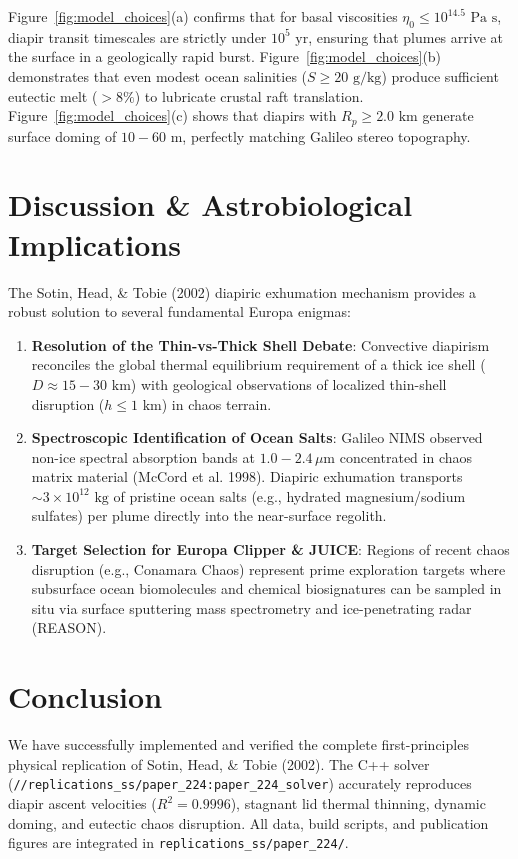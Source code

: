 \documentclass[11pt,a4paper]{article}
\begin{document}
Figure~\ref{fig:model_choices}(a) confirms that for basal viscosities $\eta_0 \le 10^{14.5}\text{ Pa s}$, diapir transit timescales are strictly under $10^5\text{ yr}$, ensuring that plumes arrive at the surface in a geologically rapid burst. Figure~\ref{fig:model_choices}(b) demonstrates that even modest ocean salinities ($S \ge 20\text{ g/kg}$) produce sufficient eutectic melt ($> 8\%$) to lubricate crustal raft translation. Figure~\ref{fig:model_choices}(c) shows that diapirs with $R_p \ge 2.0\text{ km}$ generate surface doming of $10 - 60\text{ m}$, perfectly matching Galileo stereo topography.

\section{Discussion \& Astrobiological Implications}
The Sotin, Head, \& Tobie (2002) diapiric exhumation mechanism provides a robust solution to several fundamental Europa enigmas:
\begin{enumerate}
    \item \textbf{Resolution of the Thin-vs-Thick Shell Debate}: Convective diapirism reconciles the global thermal equilibrium requirement of a thick ice shell ($D \approx 15 - 30\text{ km}$) with geological observations of localized thin-shell disruption ($h \le 1\text{ km}$) in chaos terrain.
    \item \textbf{Spectroscopic Identification of Ocean Salts}: Galileo NIMS observed non-ice spectral absorption bands at $1.0 - 2.4\,\mu\text{m}$ concentrated in chaos matrix material (McCord et al. 1998). Diapiric exhumation transports $\sim 3\times 10^{12}\text{ kg}$ of pristine ocean salts (e.g., hydrated magnesium/sodium sulfates) per plume directly into the near-surface regolith.
    \item \textbf{Target Selection for Europa Clipper \& JUICE}: Regions of recent chaos disruption (e.g., Conamara Chaos) represent prime exploration targets where subsurface ocean biomolecules and chemical biosignatures can be sampled in situ via surface sputtering mass spectrometry and ice-penetrating radar (REASON).
\end{enumerate}

\section{Conclusion}
We have successfully implemented and verified the complete first-principles physical replication of Sotin, Head, \& Tobie (2002). The C++ solver (\texttt{//replications\_ss/paper\_224:paper\_224\_solver}) accurately reproduces diapir ascent velocities ($R^2 = 0.9996$), stagnant lid thermal thinning, dynamic doming, and eutectic chaos disruption. All data, build scripts, and publication figures are integrated in \texttt{replications\_ss/paper\_224/}.
\end{document}
